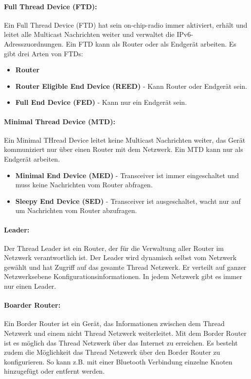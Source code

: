 \paragraph{Full Thread Device (FTD):}\label{par:FullThreadDevice}
Ein Full Thread Device (FTD) hat sein on-chip-radio immer aktiviert, erhält und leitet alle Multicast Nachrichten weiter und verwaltet die IPv6-Adresszuordnungen. Ein FTD kann als Router oder als Endgerät arbeiten. Es gibt drei Arten von FTDs: \cite[Seite 1-4]{thread_group_inc_thread_2017}

\begin{itemize}
	\item \textbf{Router}
	\item \textbf{Router Eligible End Device (REED)} - Kann Router oder Endgerät sein.
	\item \textbf{Full End Device (FED)} - Kann nur ein Endgerät sein.
\end{itemize}


\paragraph{Minimal Thread Device (MTD):}
Ein Minimal THread Device leitet keine Multicast Nachrichten weiter, das Gerät kommuniziert nur über einen Router mit dem Netzwerk. Ein MTD kann nur als Endgerät arbeiten. \cite[Seite 1-4]{thread_group_inc_thread_2017}

\begin{itemize}
	\item \textbf{Minimal End Device (MED)} - Transceiver ist immer eingeschaltet und muss keine Nachrichten vom Router abfragen. 
	\item \textbf{Sleepy End Device (SED)} - Transceiver ist ausgeschaltet, wacht nur auf um Nachrichten vom Router abzufragen.
\end{itemize}

\paragraph{Leader:}
Der Thread Leader ist ein Router, der für die Verwaltung aller Router im Netzwerk verantwortlich ist. Der Leader wird dynamisch selbst vom Netzwerk gewählt und hat Zugriff auf das gesamte Thread Netzwerk. Er verteilt auf ganzer Netzwerksebene Konfigurationsinformationen. In jedem Netzwerk gibt es immer nur einen Leader. \cite[Seite 1-4]{thread_group_inc_thread_2017}

\paragraph{Boarder Router:}
Ein Border Router ist ein Gerät, das Informationen zwischen dem Thread Netzwerk und einem nicht Thread Netzwerk weiterleitet. Mit dem Border Router ist es möglich das Thread Netzwerk über das Internet zu erreichen. Es besteht zudem die Möglichkeit das Thread Netzwerk über den Border Router zu konfigurieren. So kann z.B. mit einer Bluetooth Verbindung einzelne Knoten hinzugefügt oder entfernt werden. \cite[Seite 1-4]{thread_group_inc_thread_2017}

